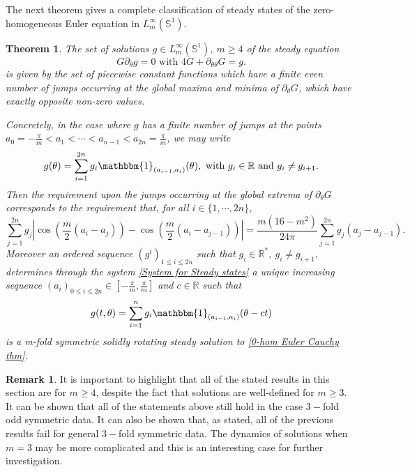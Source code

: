 \documentclass[10pt]{article}
\numberwithin{equation}{section}
\theoremstyle{plain}
\newtheorem{theorem}{Theorem}
\theoremstyle{definition}
\newtheorem{remark}[lemma]{Remark}
\newcommand{\Rr}{{\mathbb R}}
\newcommand{\crch}[1]{\left[ #1 \right]}
\newcommand{\abs}[1]{\left| #1 \right|}
\numberwithin{equation}{section}
\begin{document}
The next theorem gives a complete classification of steady states of the zero-homogeneous Euler equation in $L^\infty_m(\mathbb{S}^1)$.
\begin{theorem}\label{Steady states of the zero homogeneous Euler equation}
The set of solutions $g\in L^\infty_m(\mathbb{S}^1)$, $m \geq 4$ of the 
steady equation
\[
G\partial_\theta g=0 \text{ with } 4G+\partial_{\theta \theta}G=g.
\]
is given by the set of piecewise constant functions which have a finite even number of jumps occurring at the global maxima and minima of $\partial_\theta G$, which have exactly opposite non-zero values.

Concretely, in the case where $g$ has a finite number of jumps at the points $a_0=-\frac{\pi}{m}<a_1<\cdots<a_{n-1}<a_{2n}=\frac{\pi}{m}$, we may write
\[
g(\theta)=\sum^{2n}_{i=1}g_i\mathbbm{1}_{(a_{i-1},a_i)}(\theta), \text{ with }g_i \in \mathbb{R} \text{ and }g_i\neq g_{i+1}.
\]
Then the requirement upon the jumps occurring at the global extrema of $\partial_\theta G$ corresponds to the requirement that, for all $i\in \{1,\cdots,2n\}$,
\begin{equation}\label{System for Steady states}
\sum^{2n}_{j=1}g_j\abs{\cos\left(\frac{m}{2}(a_i-a_{j})\right)-\cos\left(\frac{m}{2}(a_i-a_{j-1})\right)}
=\frac{m(16-m^2)}{24\pi}\sum^{2n}_{j=1}g_j(a_j-a_{j-1}).
\end{equation}
Moreover an ordered sequence $(g^i)_{1\leq i\leq 2n}$  such that $g_i  \in \mathbb{R^*}, \ g_i\neq g_{i+1},$ determines through the system \eqref{System for Steady states} a unique increasing sequence $(a_i)_{0\leq i \leq 2n}\in \crch{-\frac{\pi}{m},\frac{\pi}{m}}$ and $c\in \Rr$ such that $$ \displaystyle g(t,\theta)=\sum^n_{i=1}g_i\mathbbm{1}_{(a_{i-1},a_i)}(\theta-ct)$$ is a m-fold symmetric solidly rotating steady solution to \eqref{0-hom Euler Cauchy thm}.
\end{theorem}

\begin{remark}

It is important to highlight that all of the stated results in this section are for $m\geq 4$, despite the fact that solutions are well-defined for $m\geq 3.$ It can be shown that all of the statements above still hold in the case $3-$fold odd symmetric data. It can also be shown that, as stated, all of the previous results fail for general $3-$fold symmetric data. The dynamics of solutions when $m=3$ may be more complicated and this is an interesting case for further investigation.  

\end{remark}
\end{document}
